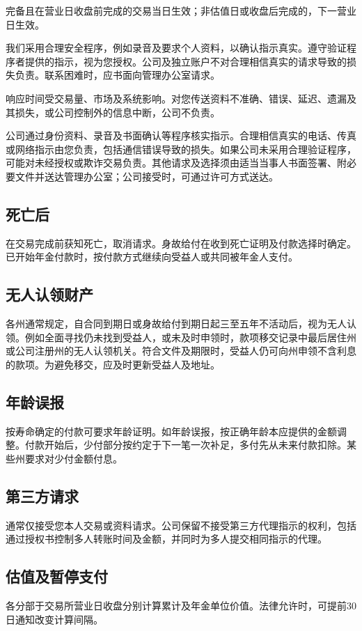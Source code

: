 \documentclass[UTF8,fontset=none,11pt,a4paper]{ctexart}
\begin{document}
完备且在营业日收盘前完成的交易当日生效；非估值日或收盘后完成的，下一营\allowbreak\mbox{业日生效。}


我们采用合理安全程序，例如录音及要求个人资料，以确认指示真实。遵守验证程序者提供的指示，视为您授权。公司及独立账户不对合理相信真实的请求导致的损失负责。联系困难时，应书面向管理办\allowbreak\mbox{公室请求。}


响应时间受交易量、市场及系统影响。对您传送资料不准确、错误、延迟、遗漏及其损失，或公司控制外的信息中断，公\allowbreak\mbox{司不负责。}


公司通过身份资料、录音及书面确认等程序核实指示。合理相信真实的电话、传真或网络指示由您负责，包括通信错误导致的损失。如果公司未采用合理验证程序，可能对未经授权或欺诈交易负责。其他请求及选择须由适当当事人书面签署、附必要文件并送达管理办公室；公司接受时，可通过许可\allowbreak\mbox{方式送达。}


\subsection*{死亡后}
在交易完成前获知死亡，取消请求。身故给付在收到死亡证明及付款选择时确定。已开始年金付款时，按付款方式继续向受益人或共同被年\allowbreak\mbox{金人支付。}


\subsection*{无人认领财产}
各州通常规定，自合同到期日或身故给付到期日起三至五年不活动后，视为无人认领。例如全面寻找仍未找到受益人，或未及时申领时，款项移交记录中最后居住州或公司注册州的无人认领机关。符合文件及期限时，受益人仍可向州申领不含利息的款项。为避免移交，应及时更新受益\allowbreak\mbox{人及地址。}


\subsection*{年龄误报}
按寿命确定的付款可要求年龄证明。如年龄误报，按正确年龄本应提供的金额调整。付款开始后，少付部分按约定于下一笔一次补足，多付先从未来付款扣除。某些州要求对少付\allowbreak\mbox{金额付息。}


\subsection*{第三方请求}
通常仅接受您本人交易或资料请求。公司保留不接受第三方代理指示的权利，包括通过授权书控制多人转账时间及金额，并同时为多人提交相同指\allowbreak\mbox{示的代理。}


\subsection*{估值及暂停支付}
各分部于交易所营业日收盘分别计算累计及年金单位价值。法律允许时，可提前30日通知改变\allowbreak\mbox{计算间隔。}
\end{document}
